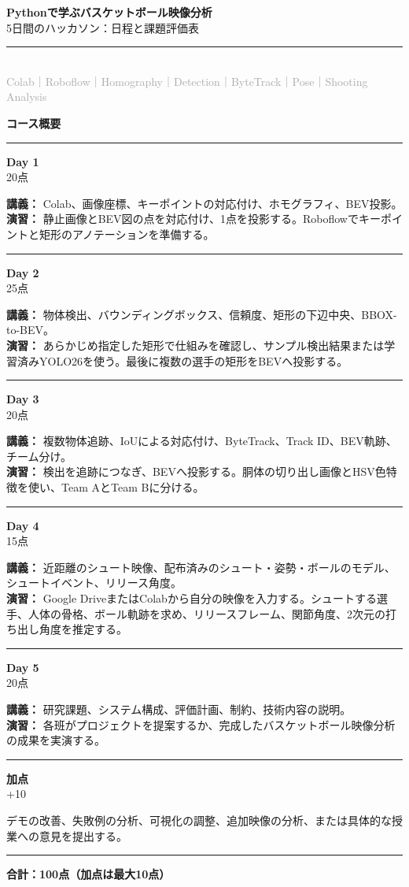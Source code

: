 \documentclass[11pt,a4paper]{article}
\newcommand{\overviewitem}[4]{%
  \noindent
  \begin{minipage}[t]{0.12\textwidth}
    \textbf{#1}\\[-0.5mm]
    {\scriptsize #4}
  \end{minipage}
  \hfill
  \begin{minipage}[t]{0.84\textwidth}
    {\scriptsize\textbf{講義：} #2}\\[-0.2mm]
    {\scriptsize\textbf{演習：} #3}
  \end{minipage}
  \par\vspace{1.2mm}
  \hrule
  \vspace{1.2mm}
}
\begin{document}
\newcommand{\tasktableheader}{%
  \rowcolor{MainBlue}
  \textcolor{white}{\textbf{完了}} &
  \textcolor{white}{\textbf{番号}} &
  \textcolor{white}{\textbf{区分}} &
  \textcolor{white}{\textbf{課題内容}} &
  \textcolor{white}{\textbf{確認事項}} &
  \textcolor{white}{\textbf{配点}} \\ \hline
}

\begin{center}
  {\LARGE\bfseries Pythonで学ぶバスケットボール映像分析}\\[4pt]
  {\Large 5日間のハッカソン：日程と課題評価表}\\[10pt]
  \rule{0.9\textwidth}{0.6pt}\\[8pt]
  {\large \textcolor{DarkGray}{Colab｜Roboflow｜Homography｜Detection｜ByteTrack｜Pose｜Shooting Analysis}}
\end{center}
\vspace{2mm}

\begin{tcolorbox}[colback=SoftGray,colframe=DarkGray,arc=1mm,boxrule=0.45pt,left=3mm,right=3mm,top=2mm,bottom=2mm]
  {\large\bfseries コース概要}
  \vspace{2mm}\hrule\vspace{1.5mm}

\overviewitem{Day 1}{Colab、画像座標、キーポイントの対応付け、ホモグラフィ、BEV投影。}{静止画像とBEV図の点を対応付け、1点を投影する。Roboflowでキーポイントと矩形のアノテーションを準備する。}{20点}
  \overviewitem{Day 2}{物体検出、バウンディングボックス、信頼度、矩形の下辺中央、BBOX-to-BEV。}{あらかじめ指定した矩形で仕組みを確認し、サンプル検出結果または学習済みYOLO26を使う。最後に複数の選手の矩形をBEVへ投影する。}{25点}
  \overviewitem{Day 3}{複数物体追跡、IoUによる対応付け、ByteTrack、Track ID、BEV軌跡、チーム分け。}{検出を追跡につなぎ、BEVへ投影する。胴体の切り出し画像とHSV色特徴を使い、Team AとTeam Bに分ける。}{20点}
  \overviewitem{Day 4}{近距離のシュート映像、配布済みのシュート・姿勢・ボールのモデル、シュートイベント、リリース角度。}{Google DriveまたはColabから自分の映像を入力する。シュートする選手、人体の骨格、ボール軌跡を求め、リリースフレーム、関節角度、2次元の打ち出し角度を推定する。}{15点}
  \overviewitem{Day 5}{研究課題、システム構成、評価計画、制約、技術内容の説明。}{各班がプロジェクトを提案するか、完成したバスケットボール映像分析の成果を実演する。}{20点}

  \noindent
  \begin{minipage}[t]{0.12\textwidth}\textbf{加点}\\[-0.5mm]{\scriptsize +10}\end{minipage}
  \hfill
  \begin{minipage}[t]{0.84\textwidth}{\scriptsize デモの改善、失敗例の分析、可視化の調整、追加映像の分析、または具体的な授業への意見を提出する。}\end{minipage}

  \vspace{2mm}\hrule\vspace{1.5mm}
  \hfill {\bfseries 合計：100点（加点は最大10点）}
\end{tcolorbox}
\end{document}
